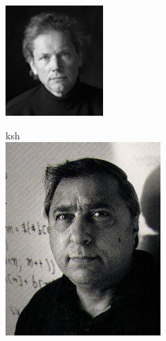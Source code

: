 \documentclass[cjk,dvipdfmx,14pt]{beamer}
\begin{document}
\begin{frame}
\begin{minipage}[t]{0.3\hsize}
   \includegraphics[width=1\hsize]{image200609/billjoy.png} 
\end{minipage}
\begin{minipage}[t]{0.3\hsize}
   ksh\\
   \includegraphics[width=1\hsize]{image200609/korn.png}
\end{minipage}


\end{frame}
\end{document}
